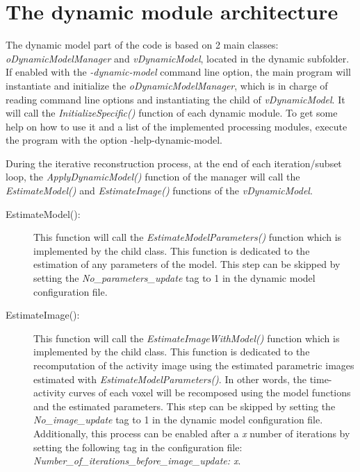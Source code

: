 \documentclass[a4paper, 11pt]{article}
\begin{document}
\clearpage
\section{The dynamic module architecture}
\label{s_archi}

The dynamic model part of the code is based on 2 main classes: \textit{oDynamicModelManager} and
\textit{vDynamicModel}, located in the dynamic subfolder. If enabled with the \textit{-dynamic-model} command line option, the main program will instantiate and initialize the \textit{oDynamicModelManager}, which is in charge of reading command line options and instantiating the child of \textit{vDynamicModel}. It will call the \textit{InitializeSpecific()} function of each dynamic module. To get some help on how to use it and a list of the implemented processing modules, execute the program with the option -help-dynamic-model. 

During the iterative reconstruction process, at the end of each iteration/subset loop, the \textit{ApplyDynamicModel()} function of the manager will call the \textit{EstimateModel()} and \textit{EstimateImage()} functions of the \textit{vDynamicModel}. 

\begin{description}
  \item[EstimateModel():]
This function will call the \textit{EstimateModelParameters()} function which is implemented by the child class. This function is dedicated to the estimation of any parameters of the model. This step can be skipped by setting the \textit{No\_parameters\_update} tag to 1 in the dynamic model configuration file.

  \item[EstimateImage():]
This function will call the \textit{EstimateImageWithModel()} function which is implemented by the child class. This function is dedicated to the recomputation of the activity image using the estimated parametric images estimated with \textit{EstimateModelParameters()}. In other words, the time-activity curves of each voxel will be recomposed using the model functions and the estimated parameters. This step can be skipped by setting the \textit{No\_image\_update} tag to 1 in the dynamic model configuration file. Additionally, this process can be enabled after a \textit{x} number of iterations by setting the following tag in the configuration file: \textit{Number\_of\_iterations\_before\_image\_update: x}.
\end{description}
\end{document}
